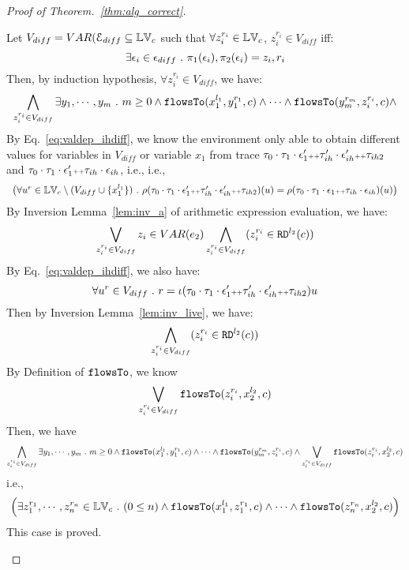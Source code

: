 \begin{proof}[Proof of Theorem.~\ref{thm:alg_correct}]
\begin{case}
\begin{subcase}
\[\]
Let $V_{diff} = VAR(\mathcal{E}_{diff} \subseteq \mathbb{LV}_c$ such that $\forall z_i^{r_i} \in \mathbb{LV}_c$, $z_i^{r_i} \in V_{diff}$ iff:
\[
  \exists \mathtt{\epsilon}_i \in \mathtt{\epsilon}_{diff} ~.~ \pi_1(\mathtt{\epsilon}_i), \pi_2(\mathtt{\epsilon}_i) = z_i, r_i
\]
Then, by induction hypothesis, $\forall z_i^{r_i} \in V_{diff}$, we have:
\[
  \bigwedge_{z_i^{r_i} \in V_{diff}}
  \exists y_1, \cdots, y_m ~.~ 
  m \geq 0 \land
  \mathtt{flowsTo}(x_1^{l_1}, y_1^{r_1}, c) \land \cdots \land \mathtt{flowsTo}(y_m^{r_m}, z_i^{r_i}, c) \land 
\]
%
%
By Eq.~\ref{eq:valdep_ihdiff}, we know 
the environment only able to obtain different values for variables in $V_{diff}$ or variable $x_1$
from trace $\mathtt{\tau}_0 \cdot \mathtt{\tau}_1 \cdot \mathtt{\epsilon}_1' {\scriptscriptstyle ++} \mathtt{\tau}_{ih}' \cdot \mathtt{\epsilon}_{ih}' {\scriptscriptstyle ++} \mathtt{\tau}_{ih2}$ 
and 
$\mathtt{\tau}_0 \cdot \mathtt{\tau}_1 \cdot \mathtt{\epsilon}_1' {\scriptscriptstyle ++} \mathtt{\tau}_{ih} \cdot \mathtt{\epsilon}_{ih}$, i.e.,
 i.e., 
\[
\begin{array}{l}
  \big(\forall u^r \in \mathbb{LV}_c \setminus (V_{diff} \cup \{x_1^{l_1}\}) ~.~
    \rho(\mathtt{\tau}_0 \cdot \mathtt{\tau}_1 \cdot \mathtt{\epsilon}_1' {\scriptscriptstyle ++} \mathtt{\tau}_{ih}' \cdot \mathtt{\epsilon}_{ih}' {\scriptscriptstyle ++} \mathtt{\tau}_{ih2}) (u) =  
    \rho(\mathtt{\tau}_0 \cdot \mathtt{\tau}_1 \cdot \mathtt{\epsilon}_1 {\scriptscriptstyle ++} \mathtt{\tau}_{ih} \cdot \mathtt{\epsilon}_{ih}) (u)
    \big)
  \end{array}
\]
%
%
By {Inversion Lemma~\ref{lem:inv_a}} of arithmetic expression evaluation, we have: 
%
\[
  \bigvee_{z_i^{r_i} \in V_{diff}} z_i \in VAR(e_2)
  \bigwedge_{z_i^{r_i} \in V_{diff}} (z_i^{r_i} \in \mathtt{RD}^{l_2}(c))
\]
%
By Eq.~\ref{eq:valdep_ihdiff}, we also have:
\[
   \forall u^r \in V_{diff} ~.~ r = \iota(\mathtt{\tau}_0 \cdot \mathtt{\tau}_1 \cdot \mathtt{\epsilon}_1' {\scriptscriptstyle ++} \mathtt{\tau}_{ih}' \cdot \mathtt{\epsilon}_{ih}' {\scriptscriptstyle ++} \mathtt{\tau}_{ih2}) u
\]
%
Then by Inversion Lemma~\ref{lem:inv_live}, we have:
\[
  \bigwedge_{z_i^{r_i} \in V_{diff}} (z_i^{r_i} \in \mathtt{RD}^{l_2}(c))
\]
%
By Definition of $\mathtt{flowsTo}$, we know
\[
   \bigvee_{z_i^{r_i} \in V_{diff}}  \mathtt{flowsTo}(z_i^{r_i}, x_2^{l_2}, c)
\]
%
%
%
Then, we have
\[
  \bigwedge_{z_i^{r_i} \in V_{diff}}
  \exists y_1, \cdots, y_m ~.~ 
  m \geq 0 \land
  \mathtt{flowsTo}(x_1^{l_1}, y_1^{r_1}, c) \land \cdots \land \mathtt{flowsTo}(y_m^{r_m}, z_i^{r_i}, c) \land 
   \bigvee_{z_i^{r_i} \in V_{diff}}  \mathtt{flowsTo}(z_i^{r_i}, x_2^{l_2}, c)
\]
i.e.,
\[
\Big(\exists z_1^{r_1}, \cdots, z_n^{r_n} \in \mathbb{LV}_{{c}} ~.~ (0 \leq n  )
 \land \mathtt{flowsTo}(x_1^{l_1}, z_1^{r_1}, c) \land \cdots \land \mathtt{flowsTo}(z_n^{r_n}, {x}_2^{l_2}, c) \Big)
\]
This case is proved.
\end{subcase}
%
\begin{subcase}

\end{subcase}
\end{case}
\end{proof}
